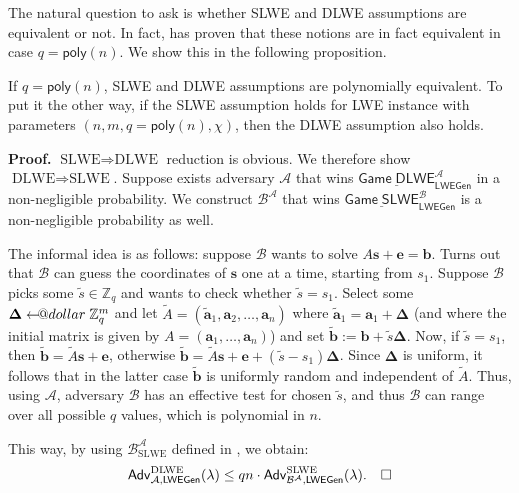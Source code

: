 \documentclass{template}
\makeatletter
\newcommand{\qedwhite}{\hfill \ensuremath{\Box}}
\newcommand\leftarrowS{\leftarrow\joinrel\smalldollar}
\newcommand{\smalldollar}{\mathrel{\mathpalette\small@dollar\relax}}
\newcommand{\small@dollar}[2]{%
  \vcenter{\hbox{%
    $#1\textnormal{\fontsize{0.7\dimexpr\f@size pt}{0}\selectfont\$}$%
  }}%
}
\makeatother
\begin{document}
The natural question to ask is whether SLWE and DLWE assumptions are equivalent
or not. In fact, \cite{regev} has proven that these notions are in fact
equivalent in case $q=\mathsf{poly}(n)$. We show this in the following
proposition.

\begin{proposition}
    If $q=\mathsf{poly}(n)$, SLWE and DLWE assumptions are polynomially
    equivalent. To put it the other way, if the SLWE assumption holds for LWE
    instance with parameters $(n,m,q=\mathsf{poly}(n),\chi)$, then the DLWE
    assumption also holds.
\end{proposition}

\textbf{Proof.} $\text{SLWE} \Rightarrow \text{DLWE}$ reduction is obvious. We
therefore show $\text{DLWE} \Rightarrow \text{SLWE}$. Suppose exists adversary
$\mathcal{A}$ that wins $\underline{\mathsf{Game} \;
\mathsf{DLWE}}_{\mathsf{LWEGen}}^{\mathcal{A}}$ in a non-negligible probability.
We construct $\mathcal{B}^{\mathcal{A}}$ that wins $\underline{\mathsf{Game} \;
\mathsf{SLWE}}_{\mathsf{LWEGen}}^{\mathcal{B}}$ is a non-negligible probability
as well.

The informal idea is as follows: suppose $\mathcal{B}$ wants to solve
$A\mathbf{s}+\mathbf{e}=\mathbf{b}$. Turns out that $\mathcal{B}$ can guess the
coordinates of $\mathbf{s}$ one at a time, starting from $s_1$. Suppose
$\mathcal{B}$ picks some $\widetilde{s} \in \mathbb{Z}_q$ and wants to check
whether $\widetilde{s} = s_1$. Select some $\boldsymbol{\Delta} \leftarrowS
\mathbb{Z}_q^m$ and let
$\widetilde{A}=(\widetilde{\mathbf{a}}_1,\mathbf{a}_2,\dots,\mathbf{a}_n)$ where
$\widetilde{\mathbf{a}}_1=\mathbf{a}_1+\boldsymbol{\Delta}$ (and where the
initial matrix is given by $A=(\mathbf{a}_1,\dots,\mathbf{a}_n)$) and set
$\widetilde{\mathbf{b}} := \mathbf{b} + \widetilde{s}\boldsymbol{\Delta}$. Now,
if $\widetilde{s}=s_1$, then $\widetilde{\mathbf{b}} = \widetilde{A}\mathbf{s} +
\mathbf{e}$, otherwise $\widetilde{\mathbf{b}} = \widetilde{A}\mathbf{s} +
\mathbf{e}+(\widetilde{s}-s_1)\boldsymbol{\Delta}$. Since $\boldsymbol{\Delta}$
is uniform, it follows that in the latter case $\widetilde{\mathbf{b}}$ is
uniformly random and independent of $\widetilde{A}$. Thus, using $\mathcal{A}$,
adversary $\mathcal{B}$ has an effective test for chosen $\widetilde{s}$, and
thus $\mathcal{B}$ can range over all possible $q$ values, which is polynomial
in $n$.

This way, by using $\mathcal{B}^{\mathcal{A}}_{\text{SLWE}}$ defined in
, we obtain:
\begin{equation*}
    \mathsf{Adv}^{\text{DLWE}}_{\mathcal{A},\mathsf{LWEGen}}(\lambda) \leq qn \cdot \mathsf{Adv}^{\text{SLWE}}_{\mathcal{B}^{\mathcal{A}},\mathsf{LWEGen}}(\lambda). \quad \qedwhite
\end{equation*}
\end{document}

